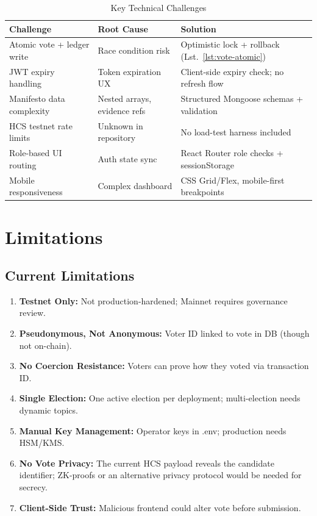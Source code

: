 \begin{table}[H]
\centering
\caption{Key Technical Challenges}
\label{tab:challenges}
\begin{tabular}{@{}lll@{}}
\toprule
\textbf{Challenge} & \textbf{Root Cause} & \textbf{Solution} \\
\midrule
Atomic vote + ledger write & Race condition risk & Optimistic lock + rollback (Lst.~\ref{lst:vote-atomic}) \\
JWT expiry handling & Token expiration UX & Client-side expiry check; no refresh flow \\
Manifesto data complexity & Nested arrays, evidence refs & Structured Mongoose schemas + validation \\
HCS testnet rate limits & Unknown in repository & No load-test harness included \\
Role-based UI routing & Auth state sync & React Router role checks + sessionStorage \\
Mobile responsiveness & Complex dashboard & CSS Grid/Flex, mobile-first breakpoints \\
\midrule
\end{tabular}
\end{table}

\section{Limitations}
\label{sec:limitations}

\subsection{Current Limitations}
\begin{enumerate}
    \item \textbf{Testnet Only:} Not production-hardened; Mainnet requires governance review.
    \item \textbf{Pseudonymous, Not Anonymous:} Voter ID linked to vote in DB (though not on-chain).
    \item \textbf{No Coercion Resistance:} Voters can prove how they voted via transaction ID.
    \item \textbf{Single Election:} One active election per deployment; multi-election needs dynamic topics.
    \item \textbf{Manual Key Management:} Operator keys in .env; production needs HSM/KMS.
    \item \textbf{No Vote Privacy:} The current HCS payload reveals the candidate identifier; ZK-proofs or an alternative privacy protocol would be needed for secrecy.
    \item \textbf{Client-Side Trust:} Malicious frontend could alter vote before submission.
\end{enumerate}

